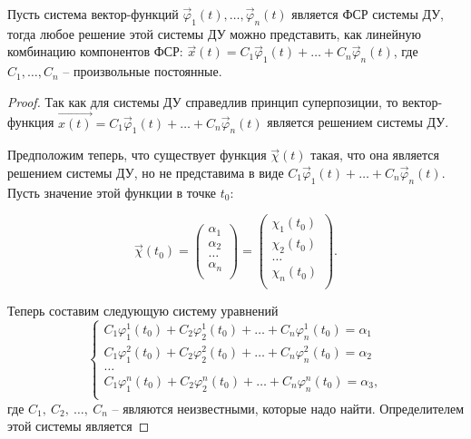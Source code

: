 \begin{theorem}
    Пусть система вектор-функций $\overrightarrow \varphi_1(t), \dots, \overrightarrow \varphi_n(t)$ является ФСР системы ДУ, тогда
    любое решение этой системы ДУ можно представить, как линейную комбинацию компонентов ФСР: 
    $\overrightarrow x(t) = C_1 \overrightarrow \varphi_1(t) + \dots + C_n \overrightarrow \varphi_n(t)$, где $C_1, \dots, C_n$ -- произвольные постоянные.
\end{theorem}
\begin{proof}
    Так как для системы ДУ справедлив принцип суперпозиции, то вектор-функция $\overrightarrow{x(t)} = C_1 \overrightarrow \varphi_1(t) + \dots + C_n \overrightarrow \varphi_n(t)$ является решением системы ДУ.
    
    Предположим теперь, что существует функция $\overrightarrow{\chi}(t)$ такая, что она является решением системы ДУ, но не представима в виде $C_1 \overrightarrow \varphi_1(t) + \dots + C_n \overrightarrow \varphi_n(t)$. Пусть значение этой функции в точке $t_0$:
    
    \begin{equation}
        \overrightarrow{\chi}(t_0) = 
        \begin{pmatrix}
            \alpha_1 \\
            \alpha_2 \\
            \dots \\
            \alpha_n \\
        \end{pmatrix} = 
        \begin{pmatrix}
            \chi_1(t_0) \\
            \chi_2(t_0) \\
            \dots \\
            \chi_n(t_0) \\
        \end{pmatrix}.
    \end{equation}
    
    Теперь составим следующую систему уравнений
    \begin{equation}
        \begin{cases}
            C_1 \varphi_1^1(t_0) + C_2 \varphi_2^1(t_0) + \dots + C_n \varphi_n^1(t_0) = \alpha_1 \\
            C_1 \varphi_1^2(t_0) + C_2 \varphi_2^2(t_0) + \dots + C_n \varphi_n^2(t_0) = \alpha_2 \\
            \dots \\
            C_1 \varphi_1^n(t_0) + C_2 \varphi_2^n(t_0) + \dots + C_n \varphi_n^n(t_0) = \alpha_3, \\
        \end{cases}
    \end{equation}
    где $C_1, ~ C_2, ~ \dots, ~ C_n$ -- являются неизвестными, которые надо найти. Определителем этой системы является
    

\end{proof}
